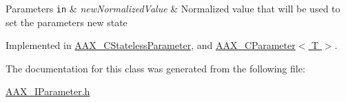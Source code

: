 \begin{DoxyParams}[1]{Parameters}
\mbox{\tt in}  & {\em new\+Normalized\+Value} & Normalized value that will be used to set the parameter\textquotesingle{}s new state \\
\hline
\end{DoxyParams}


Implemented in \hyperlink{a00040_aedecf22f14aee85864ab356896aee8e3}{A\+A\+X\+\_\+\+C\+Stateless\+Parameter}, and \hyperlink{a00033_a8a70b3c8bcff486c18e9a6e5c8ce4dda}{A\+A\+X\+\_\+\+C\+Parameter$<$ T $>$}.



The documentation for this class was generated from the following file\+:\begin{DoxyCompactItemize}
\item 
\hyperlink{a00257}{A\+A\+X\+\_\+\+I\+Parameter.\+h}\end{DoxyCompactItemize}
